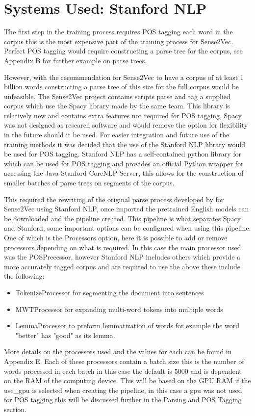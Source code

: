 \section{Systems Used: Stanford NLP}
The first step in the training process requires POS tagging each word in the corpus this is the most expensive part of the training process for Sense2Vec. Perfect POS tagging would require constructing a parse tree for the corpus, see Appendix B for further example on parse trees.

However, with the recommendation for Sense2Vec to have a corpus of at least 1 billion words constructing a parse tree of this size for the full corpus would be unfeasible. The Sense2Vec project contains scripts parse and tag a supplied corpus which use the Spacy library made by the same team. This library is relatively new and contains extra features not required for POS tagging, Spacy was not designed as research software and would remove the option for flexibility in the future should it be used. For easier integration and future use of the training methods it was decided that the use of the Stanford NLP library would be used for POS tagging. Stanford NLP has a self-contained python library for which can be used for POS tagging and provides an official Python wrapper for accessing the Java Stanford CoreNLP Server, this allows for the construction of smaller batches of parse trees on segments of the corpus.

This required the rewriting of the original parse process developed by for Sense2Vec using Stanford NLP, once imported the pretrained English models can be downloaded and the pipeline created. This pipeline is what separates Spacy and Stanford, some important options can be configured when using this pipeline. One of which is the Processors option, here it is possible to add or remove processors depending on what is required. In this case the main processor used was the POSPrecessor, however Stanford NLP includes others which provide a more accurately tagged corpus and are required to use the above these include the following:

\begin{itemize}
  \item TokenizeProcessor for segmenting the document into sentences
  \item MWTProcessor for expanding multi-word tokens into multiple words
  \item LemmaProcessor to preform lemmatization of words for example the word "better" has "good" as its lemma.
\end{itemize}
More details on the processors used and the values for each can be found in Appendix E. Each of these processors contain a batch size this is the number of words processed in each batch in this case the default is 5000 and is dependent on the RAM of the computing device. This will be based on the GPU RAM if the use\_gpu is selected when creating the pipeline, in this case a gpu was not used for POS tagging this will be discussed further in the Parsing and POS Tagging section.

